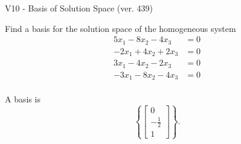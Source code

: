 \begin{exercise}
  \begin{exerciseTitle}V10 - Basis of Solution Space (ver. 439)\end{exerciseTitle}
  \begin{exerciseStatement}
    Find a basis for the solution space of the homogeneous system 
\begin{align*}
 5 x_ 1 -8 x_ 2 -4 x_ 3 &= 0  \\ 
  -2 x_ 1 + 4 x_ 2 + 2 x_ 3 &= 0  \\ 
  3 x_ 1 -4 x_ 2 -2 x_ 3 &= 0  \\ 
  -3 x_ 1 -8 x_ 2 -4 x_ 3 &= 0  \\ 
 \end{align*}


 
  \end{exerciseStatement}

  \begin{exerciseAnswer}
   A basis is   
\[\left\{\left[\begin{array}{c}
0 \\
-\frac{1}{2} \\
1
\end{array}\right]\right\}.\]

  


  \end{exerciseAnswer}
\end{exercise}